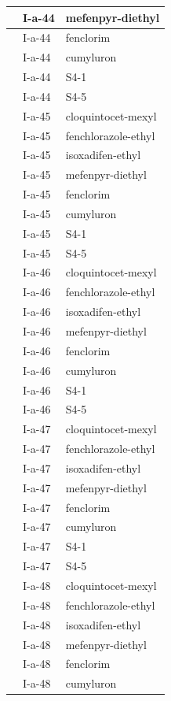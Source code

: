 \documentclass[11pt,a4paper]{article}
\begin{document}
\begin{table}[h]
\begin{tabular}{|l|l|l|}
 & I-a-44 & mefenpyr-diethyl \\ \hline
 & I-a-44 & fenclorim \\ \hline
 & I-a-44 & cumyluron \\ \hline
 & I-a-44 & S4-1 \\ \hline
 & I-a-44 & S4-5 \\ \hline
 & I-a-45 & cloquintocet-mexyl \\ \hline
 & I-a-45 & fenchlorazole-ethyl \\ \hline
 & I-a-45 & isoxadifen-ethyl \\ \hline
 & I-a-45 & mefenpyr-diethyl \\ \hline
 & I-a-45 & fenclorim \\ \hline
 & I-a-45 & cumyluron \\ \hline
 & I-a-45 & S4-1 \\ \hline
 & I-a-45 & S4-5 \\ \hline
 & I-a-46 & cloquintocet-mexyl \\ \hline
 & I-a-46 & fenchlorazole-ethyl \\ \hline
 & I-a-46 & isoxadifen-ethyl \\ \hline
 & I-a-46 & mefenpyr-diethyl \\ \hline
 & I-a-46 & fenclorim \\ \hline
 & I-a-46 & cumyluron \\ \hline
 & I-a-46 & S4-1 \\ \hline
 & I-a-46 & S4-5 \\ \hline
 & I-a-47 & cloquintocet-mexyl \\ \hline
 & I-a-47 & fenchlorazole-ethyl \\ \hline
 & I-a-47 & isoxadifen-ethyl \\ \hline
 & I-a-47 & mefenpyr-diethyl \\ \hline
 & I-a-47 & fenclorim \\ \hline
 & I-a-47 & cumyluron \\ \hline
 & I-a-47 & S4-1 \\ \hline
 & I-a-47 & S4-5 \\ \hline
 & I-a-48 & cloquintocet-mexyl \\ \hline
 & I-a-48 & fenchlorazole-ethyl \\ \hline
 & I-a-48 & isoxadifen-ethyl \\ \hline
 & I-a-48 & mefenpyr-diethyl \\ \hline
 & I-a-48 & fenclorim \\ \hline
 & I-a-48 & cumyluron \\ \hline

\end{tabular}
\end{table}
\end{document}
